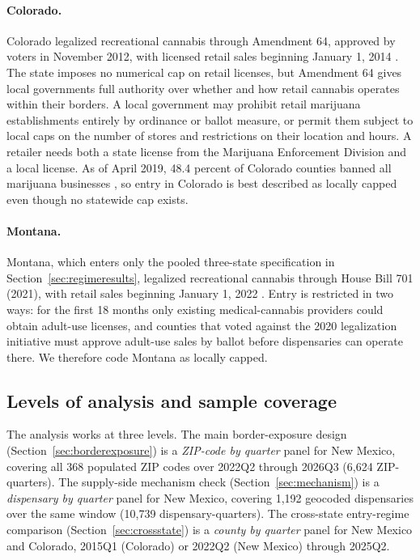 \paragraph{Colorado.} Colorado legalized recreational cannabis through Amendment
64, approved by voters in November 2012, with licensed retail sales beginning
January 1, 2014 \citep{COAmendment64}. The state imposes no numerical cap on
retail licenses, but Amendment 64 gives local governments full authority over
whether and how retail cannabis operates within their borders. A local
government may prohibit retail marijuana establishments entirely by ordinance or
ballot measure, or permit them subject to local caps on the number of stores and
restrictions on their location and hours. A retailer needs both a state license
from the Marijuana Enforcement Division and a local license. As of April 2019,
48.4 percent of Colorado counties banned all marijuana businesses
\citep{PayanBrownSong2021}, so entry in Colorado is best described as locally
capped even though no statewide cap exists.

\paragraph{Montana.} Montana, which enters only the pooled three-state
specification in Section~\ref{sec:regimeresults}, legalized recreational
cannabis through House Bill 701 (2021), with retail sales beginning January 1,
2022 \citep{MTHB701,MTBallotOptIn}. Entry is restricted in two ways: for the
first 18 months only existing medical-cannabis providers could obtain adult-use
licenses, and counties that voted against the 2020 legalization initiative must
approve adult-use sales by ballot before dispensaries can operate there. We
therefore code Montana as locally capped.

\subsection{Levels of analysis and sample coverage}
\label{sec:samplecoverage}
\label{sec:panelstructure}

The analysis works at three levels. The main border-exposure design
(Section~\ref{sec:borderexposure}) is a \emph{ZIP-code by quarter} panel for
New Mexico, covering all 368 populated ZIP codes over 2022Q2 through 2026Q3
(6,624 ZIP-quarters). The supply-side mechanism check
(Section~\ref{sec:mechanism}) is a \emph{dispensary by quarter} panel for New
Mexico, covering 1,192 geocoded dispensaries over the same window (10,739
dispensary-quarters). The cross-state entry-regime comparison
(Section~\ref{sec:crossstate}) is a \emph{county by quarter} panel for New
Mexico and Colorado, 2015Q1 (Colorado) or 2022Q2 (New Mexico) through 2025Q2.

